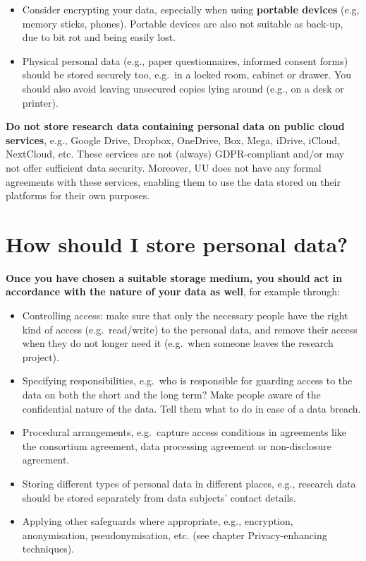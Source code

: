 \documentclass[
]{book}
\providecommand{\tightlist}{%
  \setlength{\itemsep}{0pt}\setlength{\parskip}{0pt}}
\begin{document}
\begin{itemize}
\tightlist
\item
  Consider encrypting your data, especially when using \textbf{portable devices}
  (e.g, memory sticks, phones). Portable devices are also not suitable as back-up,
  due to bit rot and being easily lost.
\item
  Physical personal data (e.g., paper questionnaires, informed consent forms)
  should be stored securely too, e.g.~in a locked room, cabinet or drawer. You
  should also avoid leaving unsecured copies lying around (e.g., on a desk or printer).
\end{itemize}

\textbf{Do not store research data containing personal data on public cloud services},
e.g., Google Drive, Dropbox, OneDrive, Box, Mega, iDrive, iCloud, NextCloud, etc.
These services are not (always) GDPR-compliant and/or may not offer sufficient
data security. Moreover, UU does not have any formal agreements with these
services, enabling them to use the data stored on their platforms for their own
purposes.

\hypertarget{data-storage-how}{%
\section{How should I store personal data?}\label{data-storage-how}}

\textbf{Once you have chosen a suitable storage medium, you should act in accordance
with the nature of your data as well}, for example through:

\begin{itemize}
\tightlist
\item
  Controlling access: make sure that only the necessary people have the right
  kind of access (e.g.~read/write) to the personal data, and remove their access
  when they do not longer need it (e.g.~when someone leaves the research project).\\
\item
  Specifying responsibilities, e.g.~who is responsible for guarding access to the
  data on both the short and the long term? Make people aware of the confidential
  nature of the data. Tell them what to do in case of a
  data breach.
\item
  Procedural arrangements, e.g.~capture access conditions in
  agreements like the consortium agreement,
  data processing agreement or non-disclosure agreement.
\item
  Storing different types of personal data in different places, e.g., research
  data should be stored separately from data subjects' contact details.
\item
  Applying other safeguards where appropriate, e.g., encryption, anonymisation,
  pseudonymisation, etc. (see chapter Privacy-enhancing
  techniques).
\end{itemize}
\end{document}
